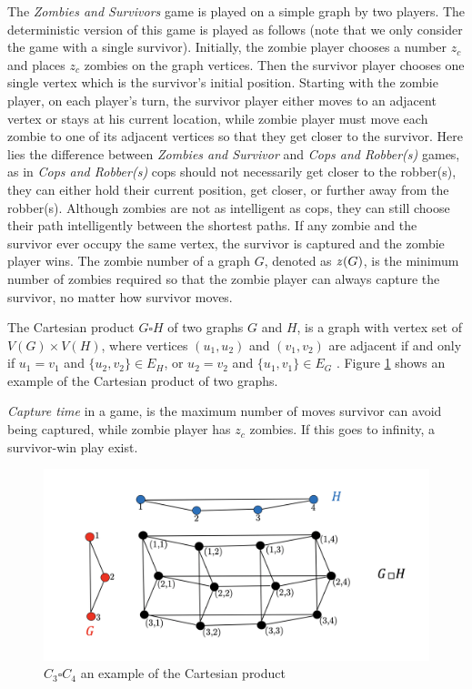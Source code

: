 \documentclass[1p]{elsarticle}
\newcommand{\zn}{\ooalign{$z$\cr\hfil\rule[.5ex]{.2em}{.08ex}\hfil\cr}}
\begin{document}
The {\it Zombies and Survivors} game is played on a simple graph by two players. The deterministic version of this game
\cite{Fitz16} is played as follows (note that we only consider the game with a single survivor). Initially, the zombie
player chooses a number $z_c$ and places $z_c$ zombies on the graph vertices. Then the survivor player chooses one
single vertex which is the survivor's initial position. Starting with the zombie player, on each player's turn, the
survivor player either moves to an adjacent vertex or stays at his current location, while zombie player must move each
zombie to one of its adjacent vertices so that they get closer to the survivor. Here lies the difference between {\it
Zombies and Survivor} and {\it Cops and Robber(s)} games, as in {\it Cops and Robber(s)} cops should not necessarily get
closer to the robber(s), they can either hold their current position, get closer, or further away from the robber(s).
Although zombies are not as intelligent as cops, they can still choose their path intelligently between the shortest
paths. If any zombie and the survivor ever occupy the same vertex, the survivor is captured and the zombie player wins.
The zombie number of a graph $G$, denoted as $\zn(G)$, is the minimum number of zombies required so that the zombie
player can always capture the survivor, no matter how survivor moves.

The Cartesian product $G \square H$ of two graphs $G$ and $H$, is a graph with vertex set of $V(G) \times V(H)$, where
vertices $(u_1 , u_2)$ and $(v_1 , v_2)$ are adjacent if and only if $u_1 = v_1$ and $ \{ u_2 , v_2 \} \in E_{H} $, or
$u_2 = v_2$ and $ \{u_1 , v_1 \} \in E_{G}$ \cite{West02}. Figure \ref{fig:p2} shows an example of the Cartesian product
of two graphs.

{\it Capture time} in a game, is the maximum number of moves survivor can avoid being captured, while zombie player has
$z_c$ zombies. If this goes to infinity, a survivor-win play exist.

\begin{figure}[h!]
	\centering
	\includegraphics[width=0.9\linewidth]{fig/CpWest.png}
	\caption{$C_3 \square C_4$ an example of the Cartesian product}
	\label{fig:p2}
\end{figure}
\end{document}
